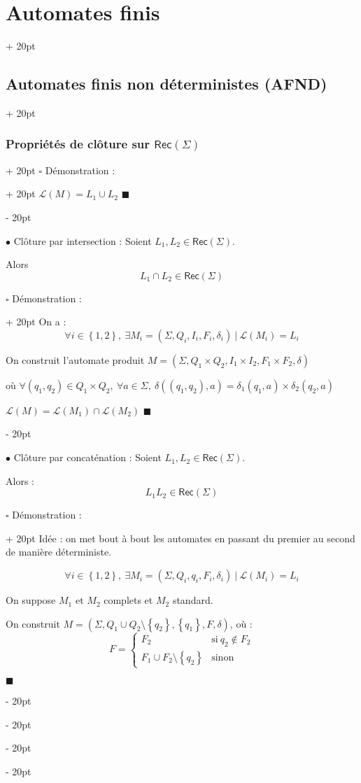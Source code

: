 \documentclass[a4paper, 12pt, twoside]{article}
\newcommand{\lr}[1]{\left( #1 \right)}
\newcommand{\set}[1]{\left\{ #1 \right\}}
\newcommand{\ind}[1][20pt]{\advance\leftskip + #1}
\newcommand{\deind}[1][20pt]{\advance\leftskip - #1}
\newenvironment{indt}[2][20pt]{#2 \par \ind[#1]}{\par \deind} %
\newenvironment{proof}[1][{Démonstration :}]{\begin{indt}{$\square$ #1}}{$\blacksquare$ \end{indt}}
\newcommand{\Rec}[1]{\mathsf{Rec}\!\lr{#1}}
\begin{document}
\begin{indt}{\section{Automates finis}}
\begin{indt}{\subsection{Automates finis non déterministes (AFND)}}
\begin{indt}{\subsubsection{Propriétés de clôture sur $\Rec \Sigma$}}
\begin{proof}
                     $\mathcal L(M) = L_1 \cup L_2$
                \end{proof}

                \vspace{12pt}
                
                $\bullet$ Clôture par intersection :
                Soient $L_1, L_2 \in \Rec \Sigma$.

                Alors
                \[
                    L_1 \cap L_2 \in \Rec \Sigma
                \]

                \begin{proof}
                    On a :
                    \[
                        \forall i \in \set{1, 2},\ \exists M_i = (\Sigma, Q_i, I_i, F_i, \delta_i)\ |\ \mathcal L(M_i) = L_i
                    \]

                    On construit l'automate produit $M = (\Sigma, Q_1 \times Q_2, I_1 \times I_2, F_1 \times F_2, \delta)$

                    où $\forall (q_1, q_2) \in Q_1 \times Q_2,\ \forall a \in \Sigma,\ \delta((q_1, q_2), a) = \delta_1(q_1, a) \times \delta_2(q_2, a)$

                     $\mathcal L(M) = \mathcal L(M_1) \cap \mathcal L(M_2)$
                \end{proof}

                \vspace{12pt}
                
                $\bullet$ Clôture par concaténation : Soient $L_1, L_2 \in \Rec \Sigma$.

                Alors :
                \[
                    L_1 L_2 \in \Rec \Sigma
                \]

                \begin{proof}
                    Idée : on met bout à bout les automates en passant du premier au second de manière déterministe.

                    \[
                        \forall i \in \set{1, 2},\ \exists M_i = (\Sigma, Q_i, q_i, F_i, \delta_i)\ |\ \mathcal L(M_i) = L_i
                    \]

                    On suppose $M_1$ et $M_2$ complets et $M_2$ standard.

                    On construit $M = \lr{\Sigma, Q_1 \cup Q_2 \setminus \set{q_2}, \set{q_1}, F, \delta}$, où :
                    \[
                        F =
                        \begin{cases}
                            F_2
                            & \text{si}\ q_2 \notin F_2
                            \\
                            F_1 \cup F_2 \setminus \set{q_2}
                            & \text{sinon}
                        \end{cases}
                    \]


\end{proof}
\end{indt}
\end{indt}
\end{indt}
\end{document}
